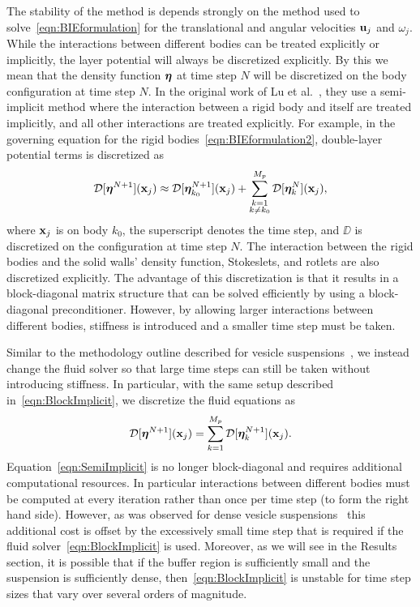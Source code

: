 \documentclass[preprint, 10pt]{elsarticle}
\begin{document}
The stability of the method is depends strongly on the method used to
solve~\eqref{eqn:BIEformulation} for the translational and angular velocities ${\mathbf{u}}_j$ and
$\omega_j$.
While the interactions between different bodies can be treated
explicitly or implicitly, the layer potential will always be discretized
explicitly. By this we mean that the density function ${\boldsymbol\eta}$ at time step $N$ will be discretized
on the body configuration at time step $N$.
In the original work of Lu et al.~\cite{Lu2017}, they use a
semi-implicit method where the interaction between a rigid body and
itself are treated implicitly, and all other interactions are treated
explicitly.  For example, in the governing equation for the rigid
bodies~\eqref{eqn:BIEformulation2}, double-layer potential
terms is discretized as
\begin{align}
 {\mathcal{D}}[{\boldsymbol\eta}^{N+1}]({\mathbf{x}}_j) \approx
  {\mathcal{D}}[{\boldsymbol\eta}^{N+1}_{k_0}]({\mathbf{x}}_j) + 
  \sum_{\substack{k=1 \\ k \neq k_0}}^{M_p} {\mathcal{D}}[{\boldsymbol\eta}^{N}_k]({\mathbf{x}}_j),
  \label{eqn:BlockImplicit}
\end{align}
where ${\mathbf{x}}_j$ is on body $k_0$, the superscript denotes the time
step, and $\DD$ is discretized on the configuration at time step $N$. The interaction between the
rigid bodies and the solid walls'
density function, Stokeslets, and rotlets are also discretized
explicitly.  The advantage of this discretization is that it results in
a block-diagonal matrix structure that can be solved efficiently by using a block-diagonal
preconditioner. However, by allowing
larger interactions between different bodies, stiffness is introduced
and a smaller time step must be taken. 

Similar to the methodology
outline described for vesicle suspensions~\cite{Quaife2014}, we instead
change the fluid solver so that large time steps can still be taken
without introducing stiffness.  In particular, with the same setup
described in~\eqref{eqn:BlockImplicit}, we discretize the fluid
equations as
\begin{align}
  {\mathcal{D}}[{\boldsymbol\eta}^{N+1}]({\mathbf{x}}_j) = 
  \sum_{k=1}^{M_p} {\mathcal{D}}[{\boldsymbol\eta}^{N+1}_k]({\mathbf{x}}_j).
  \label{eqn:SemiImplicit}
\end{align}
Equation~\eqref{eqn:SemiImplicit} is no longer block-diagonal and requires additional computational
resources. In particular
interactions between different bodies must be computed at every
iteration rather than once per time step (to form the right hand side).
However, as was observed for dense vesicle suspensions~\cite{Quaife2014, Rahimian2015} this
additional cost is offset by the
excessively small time step that is required if the fluid
solver~\eqref{eqn:BlockImplicit} is used.  Moreover, as we will see in
the Results section, it is possible that if the buffer region is
sufficiently small and the suspension is sufficiently dense,
then~\eqref{eqn:BlockImplicit} is unstable for time step sizes that vary
over several orders of magnitude.
\end{document}
